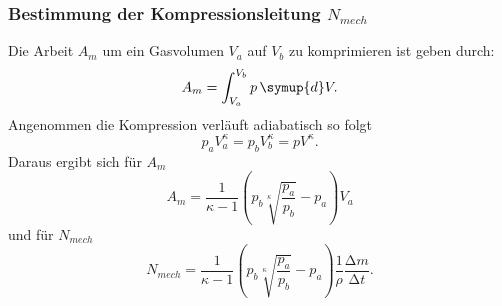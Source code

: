 \subsubsection{Bestimmung der Kompressionsleitung \texorpdfstring{$N_{mech}$}{math}}
Die Arbeit $A_m$ um ein Gasvolumen $V_a$ auf $V_b$ zu komprimieren ist geben durch:
\begin{equation}
  A_m = \int_{V_a} ^ {V_b} p \, \symup{d}V.
\end{equation}
Angenommen die Kompression verläuft adiabatisch so folgt
\begin{equation*}
  p_a V_a ^\kappa = p_b V_b ^\kappa = p V^\kappa.
\end{equation*}
Daraus ergibt sich für $A_m$
\begin{equation}
  A_m = \frac{1}{\kappa -1}\left(p_b \sqrt[\kappa]{ \frac{p_a}{p_b}}- p_a
  \right) V_a
\end{equation}
und für $N_{mech}$
\begin{equation}
  N_{mech} = \frac{1}{\kappa -1}\left(p_b \sqrt[\kappa]{ \frac{p_a}{p_b}}- p_a
  \right) \frac{1}{\rho} \frac{\increment m}{\increment t}.
\end{equation}





























%

